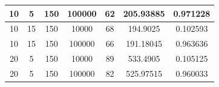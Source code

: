 \documentclass[11pt,a4paper]{report}
\begin{document}
\begin{table}[H]
{\begin{tabular}{c|c|c|c|c|c|c}
10                                                                                   & 5                                                                                      & 150                                                                        & 100000                                                                    & 62                                                                                        & 205.93885                                                                 & 0.971228              \\ \hline
10                                                                                   & 15                                                                                     & 150                                                                        & 10000                                                                     & 68                                                                                        & 194.9025                                                                  & 0.102593              \\
10                                                                                   & 15                                                                                     & 150                                                                        & 100000                                                                    & 66                                                                                        & 191.18045                                                                 & 0.963636              \\ \hline
20                                                                                   & 5                                                                                      & 150                                                                        & 10000                                                                     & 89                                                                                        & 533.4905                                                                  & 0.105125              \\
20                                                                                   & 5                                                                                      & 150                                                                        & 100000                                                                    & 82                                                                                        & 525.97515                                                                 & 0.960033              \\ \hline

\end{tabular}}
\end{table}
\end{document}
